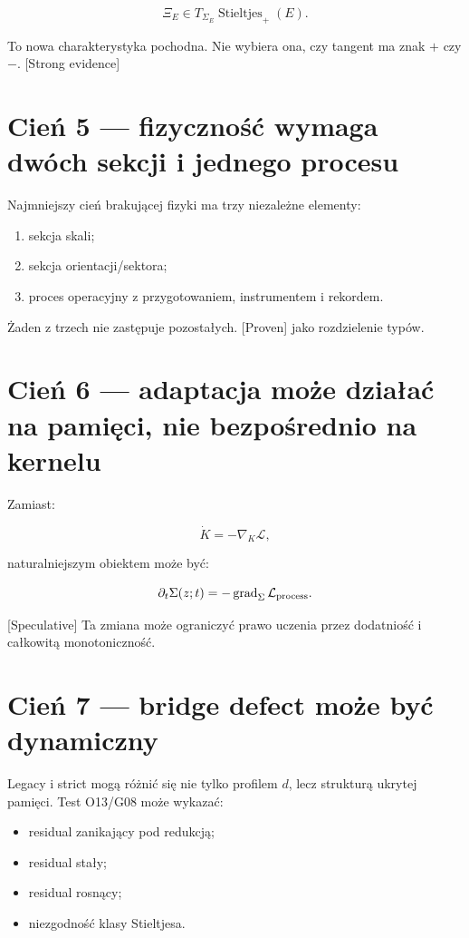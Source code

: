 \documentclass[11pt,a4paper,openany]{report}
\newcommand{\statusProven}{\textcolor{fingreen}{[Proven]}}
\newcommand{\statusStrong}{\textcolor{finblue}{[Strong evidence]}}
\newcommand{\statusSpeculative}{\textcolor{finorange}{[Speculative]}}
\begin{document}
\[
\Xi_E\in T_{\Sigma_E}\operatorname{Stieltjes}_+(E).
\]

To nowa charakterystyka pochodna. Nie wybiera ona, czy tangent ma znak \(+\) czy \(-\). \statusStrong{}

\section{Cień 5 --- fizyczność wymaga dwóch sekcji i jednego procesu}

Najmniejszy cień brakującej fizyki ma trzy niezale\.zne elementy:

\begin{enumerate}
\item 
sekcja skali;

\item 
sekcja orientacji/\allowbreak{}sektora;

\item 
proces operacyjny z przygotowaniem, instrumentem i rekordem.

\end{enumerate}

\.Zaden z trzech nie zastępuje pozostałych. \statusProven{} jako rozdzielenie typów.

\section{Cień 6 --- adaptacja mo\.ze działać na pamięci, nie bezpośrednio na kernelu}

Zamiast:

\[
\dot K=-\nabla_K\mathcal L,
\]

naturalniejszym obiektem mo\.ze być:

\[
\partial_t\Sigma(z;t)
=-\operatorname{grad}_{\Sigma}\mathcal L_{\rm process}.
\]

\statusSpeculative{} Ta zmiana mo\.ze ograniczyć prawo uczenia przez dodatniość i całkowitą monotoniczność.

\section{Cień 7 --- bridge defect mo\.ze być dynamiczny}

Legacy i strict mogą ró\.znić się nie tylko profilem \(d\), lecz strukturą ukrytej pamięci. Test O13/\allowbreak{}G08 mo\.ze wykazać:

\begin{itemize}
\item 
residual zanikający pod redukcją;

\item 
residual stały;

\item 
residual rosnący;

\item 
niezgodność klasy Stieltjesa.

\end{itemize}
\end{document}
